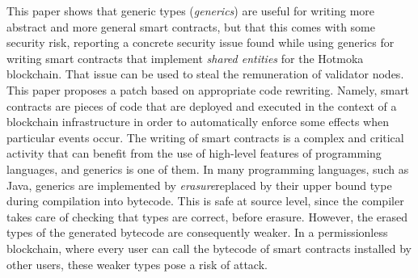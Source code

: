 This paper shows that generic types (\emph{generics}) are useful for writing more abstract and more general smart contracts, but that this comes with some security risk, reporting a concrete security issue found while using generics for writing smart contracts that implement \emph{shared entities} for the Hotmoka blockchain. That issue can be used to steal the remuneration of validator nodes. This paper proposes a patch based on appropriate code rewriting. Namely, smart contracts are pieces of code that are deployed and executed in the context of a blockchain infrastructure in order to automatically enforce some effects when particular events occur. The writing of smart contracts is a complex and critical activity that can benefit from the use of high-level features of programming languages, and generics is one of them. In many programming languages, such as Java, generics are implemented by \emph{erasure}\ie replaced by their upper bound type during compilation into bytecode. This is safe at source level, since the compiler takes care of checking that types are correct, before erasure. However, the erased types of the generated bytecode are consequently weaker. In a permissionless blockchain, where every user can call the bytecode of smart contracts installed by other users, these weaker types pose a risk of attack.
